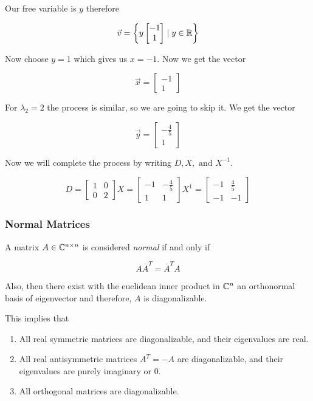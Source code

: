 Our free variable is \(y\) therefore 

\[
    \vec{v} = \left\{ y \begin{bmatrix} -1 \\ 1\end{bmatrix} \mid  y \in \mathbb{R} \right\}
\]

Now choose \(y = 1\) which gives us \(x = -1\). Now we get the vector 

\[
    \vec{x} = \begin{bmatrix}
        -1 \\ 1
    \end{bmatrix}
\]

For \(\lambda_2 = 2\) the process is similar, so we are going to skip it. We get the vector

\[
    \vec{y} = \begin{bmatrix}
        -\frac{4}{5} \\ 1
    \end{bmatrix}
\]

Now we will complete the process by writing \(D, X, \text{ and } X^{-1}\).

\[
    D = \begin{bmatrix}
        1 & 0 \\
        0 & 2
    \end{bmatrix}
    X = \begin{bmatrix}
        -1  & -\frac{4}{5} \\
        1   &   1 
    \end{bmatrix}
    X^{1} = \begin{bmatrix}
        -1  & \frac{4}{5} \\
        -1   &   -1 
    \end{bmatrix}
\]

\subsubsection{Normal Matrices}

A matrix \(A \in \mathbb{C}^{n \times n}\) is considered \emph{normal} if and only if 

\[
    A \overline{A}^{T} = \overline{A}^T A
\]  

Also, then there exist with the euclidean inner product in \(\mathbb{C}^n\) an orthonormal basis 
of eigenvector and therefore, \(A\) is diagonalizable.

This implies that

\begin{enumerate}
    
    \item All real symmetric matrices are diagonalizable, and their eigenvalues are real.
    
    \item All real antisymmetric matrices \(A^T = -A\) are diagonalizable, and their eigenvalues are 
          purely imaginary or 0. 

    \item All orthogonal matrices are diagonalizable.

\end{enumerate}

